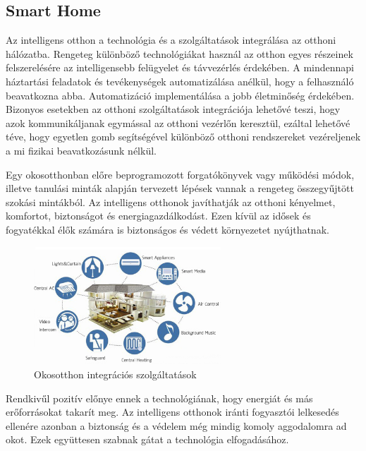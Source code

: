 \subsection{Smart Home}
Az intelligens otthon a technológia és a szolgáltatások integrálása az otthoni hálózatba. Rengeteg különböző technológiákat használ az otthon egyes részeinek felszerelésére az intelligensebb felügyelet és távvezérlés érdekében. A mindennapi háztartási feladatok és tevékenységek automatizálása anélkül, hogy a felhasználó beavatkozna abba.  Automatizáció implementálása a jobb életminőség érdekében. Bizonyos esetekben az otthoni szolgáltatások integrációja lehetővé teszi, hogy azok kommunikáljanak egymással az otthoni vezérlőn keresztül, ezáltal lehetővé téve, hogy egyetlen gomb segítségével különböző otthoni rendszereket vezéreljenek a mi fizikai beavatkozásunk nélkül.
\par Egy okosotthonban előre beprogramozott forgatókönyvek vagy működési módok, illetve tanulási minták alapján tervezett lépések vannak a rengeteg összegyűjtött szokási mintákból. Az intelligens otthonok javíthatják az otthoni kényelmet, komfortot, biztonságot és energiagazdálkodást. Ezen kívül az idősek és fogyatékkal élők számára is biztonságos és védett környezetet nyújthatnak.\cite{smart-home-technology}
\begin{figure}[!ht]
    \centering
    \includegraphics[width=70mm, keepaspectratio]{figures/smart-home.jpg}
    \caption{Okosotthon integrációs szolgáltatások}
\end{figure}
\par Rendkivűl pozitív előnye ennek a technológiának, hogy energiát és más erőforrásokat takarít meg. Az intelligens otthonok iránti fogyasztói lelkesedés ellenére azonban a biztonság és a védelem még mindig komoly aggodalomra ad okot. Ezek együttesen szabnak gátat a technológia elfogadásához.

